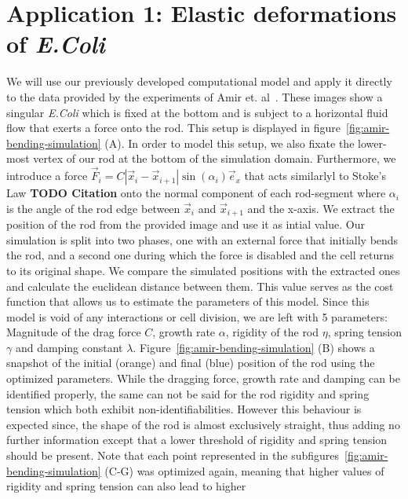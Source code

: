 \documentclass{article}
\begin{document}
\section{Application 1: Elastic deformations of \textit{E.Coli}}
\label{section:application-1}

We will use our previously developed computational model and apply it directly to the data provided
by the experiments of Amir et. al~\cite{Amir2014,Amir2014_2}.
These images show a singular \textit{E.Coli} which is fixed at the bottom and is subject to a
horizontal fluid flow that exerts a force onto the rod.
This setup is displayed in figure~\ref{fig:amir-bending-simulation} (A).
In order to model this setup, we also fixate the lower-most vertex of our rod at the bottom of the
simulation domain.
Furthermore, we introduce a force $\vec{F}_i = C |\vec{x}_i - \vec{x}_{i+1}|\sin(\alpha_i)\vec{e}_x$
that acts similarlyl to Stoke's Law \textbf{TODO Citation} onto the normal component of each
rod-segment where $\alpha_i$ is the angle of the rod edge between $\vec{x}_i$ and $\vec{x}_{i+1}$
and the x-axis.
We extract the position of the rod from the provided image and use it as intial value.
Our simulation is split into two phases, one with an external force that initially bends the rod,
and a second one during which the force is disabled and the cell returns to its original shape.
We compare the simulated positions with the extracted ones and calculate the euclidean distance
between them.
This value serves as the cost function that allows us to estimate the parameters of this model.
Since this model is void of any interactions or cell division, we are left with 5 parameters:
Magnitude of the drag force $C$, growth rate $\alpha$, rigidity of the rod $\eta$, spring tension
$\gamma$ and damping constant $\lambda$.
Figure~\ref{fig:amir-bending-simulation} (B) shows a snapshot of the initial (orange) and final
(blue) position of the rod using the optimized parameters.
While the dragging force, growth rate and damping can be identified properly, the same
can not be said for the rod rigidity and spring tension which both exhibit non-identifiabilities.
However this behaviour is expected since, the shape of the rod is almost exclusively straight,
thus adding no further information except that a lower threshold of rigidity and spring tension
should be present.
Note that each point represented in the subfigures~\ref{fig:amir-bending-simulation} (C-G) was
optimized again, meaning that higher values of rigidity and spring tension can also lead to higher
\end{document}
